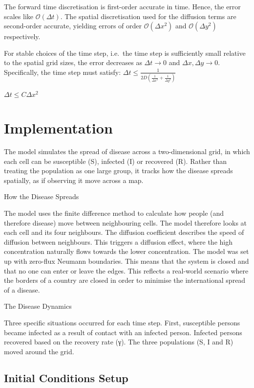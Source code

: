 \documentclass[
  letterpaper,
  DIV=11,
  numbers=noendperiod]{scrartcl}
\begin{document}
The forward time discretisation is first-order accurate in time. Hence,
the error scales like \(\mathcal{O}(\Delta t)\). The spatial
discretisation used for the diffusion terms are second-order accurate,
yielding errors of order \(\mathcal{O}(\Delta x^2)\) and
\(\mathcal{O}(\Delta y^2)\) respectively.

For stable choices of the time step, i.e.~the time step is sufficiently
small relative to the spatial grid sizes, the error decreases as
\(\Delta t \to 0\) and \(\Delta x, \Delta y \to 0\). Specifically, the
time step must satisfy:
\(\Delta t \le \frac{1}{2D\left(\frac{1}{\Delta x^2} + \frac{1}{\Delta y^2}\right)}\)

\(\Delta t \le C \Delta x^2\)

\section{Implementation}\label{implementation}

The model simulates the spread of disease across a two-dimensional grid,
in which each cell can be susceptible (S), infected (I) or recovered
(R). Rather than treating the population as one large group, it tracks
how the disease spreads spatially, as if observing it move across a map.

How the Disease Spreads

The model uses the finite difference method to calculate how people (and
therefore disease) move between neighbouring cells. The model therefore
looks at each cell and its four neighbours. The diffusion coefficient
describes the speed of diffusion between neighbours. This triggers a
diffusion effect, where the high concentration naturally flows towards
the lower concentration. The model was set up with zero-flux Neumann
boundaries. This means that the system is closed and that no one can
enter or leave the edges. This reflects a real-world scenario where the
borders of a country are closed in order to minimise the international
spread of a disease.

The Disease Dynamics

Three specific situations occurred for each time step. First,
susceptible persons became infected as a result of contact with an
infected person. Infected persons recovered based on the recovery rate
(γ). The three populations (S, I and R) moved around the grid.

\subsection{Initial Conditions Setup}\label{initial-conditions-setup}
\end{document}
